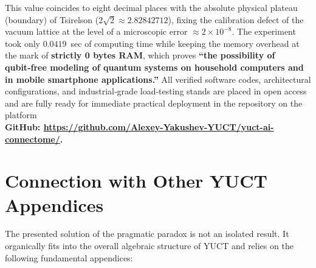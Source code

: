 \documentclass[12pt,a4paper]{article}
\begin{document}
	This value coincides to eight decimal places with the absolute physical plateau (boundary) of Tsirelson (\(2\sqrt{2} \approx 2.82842712\)), fixing the calibration defect of the vacuum lattice at the level of a microscopic error \(\approx 2 \times 10^{-8}\). The experiment took only \(0.0419\)~sec of computing time while keeping the memory overhead at the mark of \textbf{strictly 0 bytes RAM}, which proves \textbf{“the possibility of qubit‑free modeling of quantum systems on household computers and in mobile smartphone applications.”}
	All verified software codes, architectural configurations, and industrial‑grade load‑testing stands are placed in open access and are fully ready for immediate practical deployment in the repository on the platform \\
	\small \textbf{GitHub: \url{https://github.com/Alexey-Yakushev-YUCT/yuct-ai-connectome/}.}
	
	
	
	\section{Connection with Other YUCT Appendices}
	
	The presented solution of the pragmatic paradox is not an isolated result. It organically fits into the overall algebraic structure of YUCT and relies on the following fundamental appendices:
	
\end{document}
